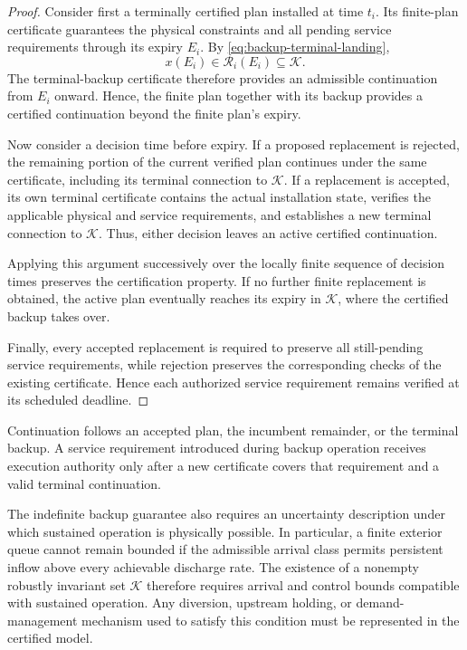 \begin{proof}
Consider first a terminally certified plan installed at time $t_i$. Its
finite-plan certificate guarantees the physical constraints and all pending
service requirements through its expiry $E_i$. By
\eqref{eq:backup-terminal-landing},
\[
x(E_i)\in\mathcal R_i(E_i)\subseteq\mathcal K.
\]
The terminal-backup certificate therefore provides an admissible continuation
from $E_i$ onward. Hence, the finite plan together with its backup provides a
certified continuation beyond the finite plan's expiry.

Now consider a decision time before expiry. If a proposed replacement is
rejected, the remaining portion of the current verified plan continues under
the same certificate, including its terminal connection to $\mathcal K$. If a
replacement is accepted, its own terminal certificate contains the actual
installation state, verifies the applicable physical and service requirements,
and establishes a new terminal connection to $\mathcal K$. Thus, either
decision leaves an active certified continuation.

Applying this argument successively over the locally finite sequence of
decision times preserves the certification property. If no further finite
replacement is obtained, the active plan eventually reaches its expiry in
$\mathcal K$, where the certified backup takes over.

Finally, every accepted replacement is required to preserve all still-pending
service requirements, while rejection preserves the corresponding checks of
the existing certificate. Hence each authorized service requirement remains
verified at its scheduled deadline.
\end{proof}

Continuation follows an accepted plan, the incumbent remainder, or the
terminal backup. A service requirement introduced during backup operation
receives execution authority only after a new certificate covers that
requirement and a valid terminal continuation.

The indefinite backup guarantee also requires an uncertainty description
under which sustained operation is physically possible. In particular, a
finite exterior queue cannot remain bounded if the admissible arrival class
permits persistent inflow above every achievable discharge rate. The existence
of a nonempty robustly invariant set $\mathcal K$ therefore requires arrival
and control bounds compatible with sustained operation. Any diversion,
upstream holding, or demand-management mechanism used to satisfy this
condition must be represented in the certified model.

